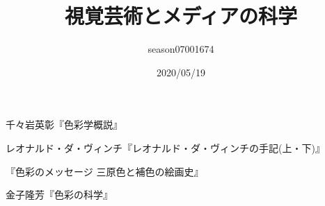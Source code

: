 \documentclass{jsarticle}
\title{視覚芸術とメディアの科学}
\author{season07001674}
\date{2020/05/19}
\begin{document}
\maketitle
\tableofcontents


\begin{thebibliography}{99}
	\item 千々岩英彰『色彩学概説』
	\item レオナルド・ダ・ヴィンチ『レオナルド・ダ・ヴィンチの手記(上・下)』
	\item 『色彩のメッセージ 三原色と補色の絵画史』
	\item 金子隆芳『色彩の科学』
\end{thebibliography}
\end{document}
